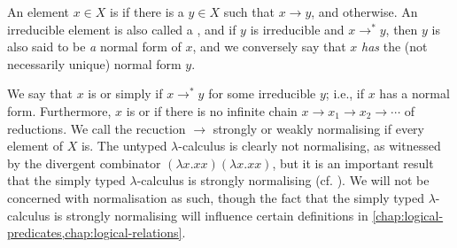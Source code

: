 An element $x \in X$ is  if there is a $y \in X$ such that $x \to y$, and  otherwise. An irreducible element is also called a , and if $y$ is irreducible and $x \to^* y$, then $y$ is also said to be \emph{a} normal form of $x$, and we conversely say that $x$ \emph{has} the (not necessarily unique) normal form $y$.

We say that $x$ is  or simply  if $x \to^* y$ for some irreducible $y$; i.e., if $x$ has a normal form. Furthermore, $x$ is  or  if there is no infinite chain $x \to x_1 \to x_2 \to \cdots$ of reductions. We call the recuction $\to$ strongly or weakly normalising if every element of $X$ is. The untyped $\lambda$-calculus is clearly not normalising, as witnessed by the divergent combinator $(\lambda x.xx)(\lambda x.xx)$, but it is an important result that the simply typed $\lambda$-calculus is strongly normalising (cf. \cite[Theorem~12.1.6]{pierce-types}). We will not be concerned with normalisation as such, though the fact that the simply typed $\lambda$-calculus is strongly normalising will influence certain definitions in \cref{chap:logical-predicates,chap:logical-relations}.


